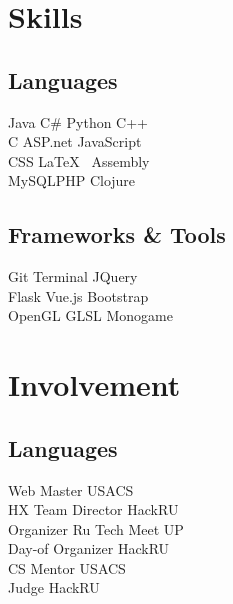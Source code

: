 \documentclass[]{deedy-resume-openfont}
\begin{document}
\begin{minipage}[t]{0.33\textwidth}

\section{Skills}
\subsection{Languages}
Java \textbullet{} C\# \textbullet{} Python \textbullet{} C++ \\
C\textbullet{} ASP.net \textbullet{} JavaScript \\ 
CSS \textbullet{} \LaTeX\ \textbullet{} Assembly \\
MySQL\textbullet{}PHP \textbullet{}Clojure\\
\sectionsep
\sectionsep
\subsection{Frameworks \& Tools}
Git \textbullet{}  Terminal \textbullet{} JQuery\\
Flask\textbullet{} Vue.js\textbullet{} Bootstrap \\ 
OpenGL \textbullet{} GLSL \textbullet{} Monogame
\sectionsep


\section{Involvement} 
\subsection{Languages}
Web Master \textbullet{} USACS \\ 
HX Team Director \textbullet{} HackRU \\
Organizer \textbullet{} Ru Tech Meet UP \\ 
Day-of Organizer \textbullet{} HackRU \\
CS Mentor \textbullet{} USACS \\  
Judge \textbullet{} HackRU \\
\sectionsep


%
%

\end{minipage} 
\end{document}
